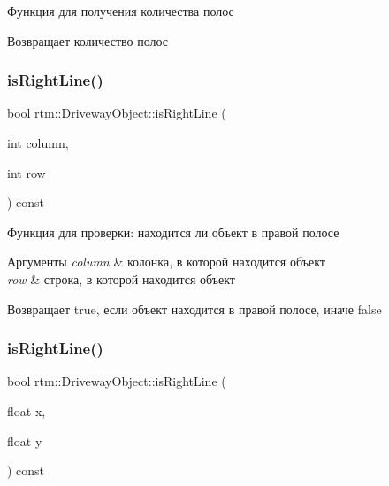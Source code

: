 Функция для получения количества полос \begin{DoxyReturn}{Возвращает}
количество полос 
\end{DoxyReturn}
\mbox{\label{classrtm_1_1_driveway_object_ae427989fc802b24d06f6b7f83959be2a}} 
\subsubsection{\texorpdfstring{is\+Right\+Line()}{isRightLine()}\hspace{0.1cm}{\footnotesize\ttfamily [1/2]}}
{\footnotesize\ttfamily bool rtm\+::\+Driveway\+Object\+::is\+Right\+Line (\begin{DoxyParamCaption}\item[{int}]{column,  }\item[{int}]{row }\end{DoxyParamCaption}) const}

Функция для проверки\+: находится ли объект в правой полосе 
\begin{DoxyParams}{Аргументы}
{\em column} & колонка, в которой находится объект \\
\hline
{\em row} & строка, в которой находится объект \\
\hline
\end{DoxyParams}
\begin{DoxyReturn}{Возвращает}
true, если объект находится в правой полосе, иначе false 
\end{DoxyReturn}
\mbox{\label{classrtm_1_1_driveway_object_addaa5faebb5469e8074a46f6c3584e56}} 
\subsubsection{\texorpdfstring{is\+Right\+Line()}{isRightLine()}\hspace{0.1cm}{\footnotesize\ttfamily [2/2]}}
{\footnotesize\ttfamily bool rtm\+::\+Driveway\+Object\+::is\+Right\+Line (\begin{DoxyParamCaption}\item[{float}]{x,  }\item[{float}]{y }\end{DoxyParamCaption}) const}

